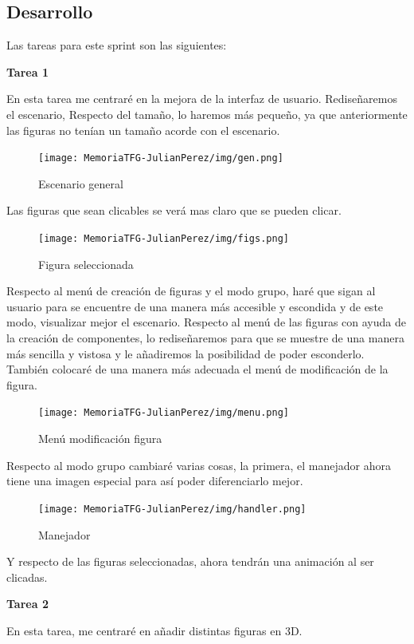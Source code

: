 \documentclass[a4paper, 12pt]{book}
\begin{document}
\subsection{Desarrollo}
Las tareas para este sprint son las siguientes:

\textbf{Tarea 1}

En esta tarea me centraré en la mejora de la interfaz de usuario. Rediseñaremos el escenario, Respecto del tamaño, lo haremos más pequeño, ya que anteriormente las figuras no tenían un tamaño acorde con el escenario.

\begin{figure}[H]
  \centering
  \texttt{[image: MemoriaTFG-JulianPerez/img/gen.png]}
  \caption{Escenario general}\label{gen}
\end{figure}

Las figuras que sean clicables se verá mas claro que se pueden clicar.
\begin{figure}[H]
  \centering
  \texttt{[image: MemoriaTFG-JulianPerez/img/figs.png]}
  \caption{Figura seleccionada}\label{scrum}
\end{figure}

Respecto al menú de creación de figuras y el modo grupo, haré que sigan al usuario para se encuentre de una manera más accesible y escondida y de este modo, visualizar mejor el escenario. Respecto al menú de las figuras con ayuda de la creación de componentes, lo rediseñaremos para que se muestre de una manera más sencilla y vistosa y le añadiremos la posibilidad de poder esconderlo. También colocaré de una manera más adecuada el menú de modificación de la figura. 

\begin{figure}[H]
  \centering
  \texttt{[image: MemoriaTFG-JulianPerez/img/menu.png]}
  \caption{Menú modificación figura}\label{scrum}
\end{figure}

Respecto al modo grupo cambiaré varias cosas, la primera, el manejador ahora tiene una imagen especial para así poder diferenciarlo mejor.

\begin{figure}[H]
  \centering
  \texttt{[image: MemoriaTFG-JulianPerez/img/handler.png]}
  \caption{Manejador}\label{scrum}
\end{figure}

Y respecto de las figuras seleccionadas, ahora tendrán una animación al ser clicadas.

\textbf{Tarea 2}

En esta tarea, me centraré en añadir distintas figuras en 3D.
\end{document}
